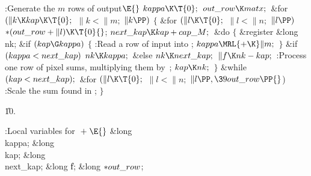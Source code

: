 \Y\B\4:Generate the $m$ rows of output\X${}\E{}$\6
$\\{kappa}\K\T{0};{}$\6
${}\\{out\_row}\K\\{matx};{}$\6
\&{for} ${}(\|k\K\\{kap}\K\T{0};{}$ ${}\|k<\|m;{}$ ${}\|k\PP){}$\5
${}\{{}$\1\6
\&{for} ${}(\|l\K\T{0};{}$ ${}\|l<\|n;{}$ ${}\|l\PP){}$\1\5
${}{*}(\\{out\_row}+\|l)\K\T{0}{}$;\2\6
${}\\{next\_kap}\K\\{kap}+\\{cap\_M};{}$\6
\&{do}\5
${}\{{}$\5
\1\&{register} \&{long} \\{nk};%
\7
\&{if} ${}(\\{kap}\G\\{kappa}){}$\5
${}\{{}$\1\6
:Read a row of input into \X;\6
${}\\{kappa}\MRL{+{\K}}\|m;{}$\6
\4${}\}{}$\2\6
\&{if} ${}(\\{kappa}<\\{next\_kap}){}$\1\5
${}\\{nk}\K\\{kappa};{}$\2\6
\&{else}\1\5
${}\\{nk}\K\\{next\_kap};{}$\2\6
${}\|f\K\\{nk}-\\{kap};{}$\6
:Process one row of pixel sums, multiplying them by~\X;\6
${}\\{kap}\K\\{nk};{}$\6
\4${}\}{}$\5
\2\5
\&{while} ${}(\\{kap}<\\{next\_kap});{}$\6
\&{for} ${}(\|l\K\T{0};{}$ ${}\|l<\|n;{}$ ${}\|l\PP,\39\\{out\_row}\PP{}$)\1\6
:Scale the sum found in \X;\2\6
\4${}\}{}$\2\par
\U10.\fi

\B{}:Local variables for \X${}\mathrel+\E{}$\6
\&{long} \\{kappa};\6
\&{long} \\{kap};\6
\&{long} \\{next\_kap};\6
\&{long} \|f;\6
\&{long} ${}{*}\\{out\_row}{}$;\par
\fi

